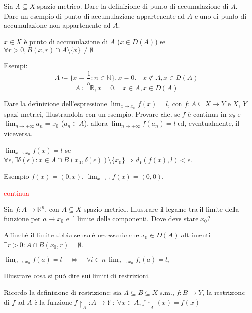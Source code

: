 \documentclass{exam}
\newcommand{\R}[0]{\mathbb{R}}
\newcommand{\N}[0]{\mathbb{N}}
\newcommand{\err}[1]{\textcolor{red}{#1}}
\begin{document}
\begin{questions}
\question Sia $A \subseteq X$ spazio metrico. Dare la definizione di punto di accumulazione di $A$. Dare un esempio di punto di accumulazione appartenente ad $A$ e uno di punto di accumulazione non appartenente ad $A$.
\begin{solution}
    $x\in X$ è punto di accumulazione di $A$ ($x \in D(A)$) se $\forall r>0, B(x,r) \cap A \setminus \{x\} \not= \emptyset$

    Esempi:
    \begin{equation*}
        A \coloneqq \{x=\frac{1}{n}:n \in \N\}, x= 0.\quad  x \not\in A, x \in D(A)
    \end{equation*}
    \begin{equation*}
        A \coloneqq \R, x= 0.\quad  x \in A, x \in D(A)
    \end{equation*}
\end{solution}

\question Dare la definizione dell'espressione $\lim_{x\rightarrow x_0} f(x) = l$, con $f: A \subseteq X \rightarrow Y$ e $X$, $Y$ spazi metrici, illustrandola con un esempio. Provare che, se $f$ è continua in $x_0$ e $\lim_{n\rightarrow + \infty}a_n = x_0$ ($a_n \in A$), allora $\lim_{n\rightarrow + \infty} f(a_n) = l$ ed, eventualmente, il viceversa.
\begin{solution}
$\lim_{x\rightarrow x_0} f(x) = l$ se $ \forall\epsilon, \exists \delta(\epsilon) : x \in A \cap B(x_0, \delta(\epsilon)) \setminus \{x_0\} \Rightarrow d_Y(f(x),l)<\epsilon$.

Esempio $f(x) = (0,x)$, $\lim_{x\rightarrow 0} f(x)=(0,0)$.

\err{continua}
\end{solution}

\question Sia $f: A \rightarrow \R^n$, con $A\subseteq X$ spazio metrico. Illustrare il legame tra il limite della funzione per $a \rightarrow x_0$ e il limite delle componenti. Dove deve stare $x_0$?
\begin{solution}
    Affinché il limite abbia senso è necessario che $x_0 \in D(A)$ altrimenti $\exists r>0 : A\cap B(x_0,r) = \emptyset$.

    $\lim_{a\rightarrow x_0}f(a) = l \quad \iff \quad \forall i \in n \ \lim_{a\rightarrow x_0}f_i(a) = l_i $
\end{solution}

\question Illustrare cosa si può dire sui limiti di restrizioni. 
\begin{solution}
    Ricordo la definizione di restrizione: sia $A\subseteq B\subseteq X$ s.m., $f:B\to Y$, la restrizione di $f$ ad $A$ è la funzione $f\restriction_A: A \to Y \ : \ \forall x \in A, f\restriction_A(x) = f(x)$
    

\end{solution}
\end{questions}
\end{document}
